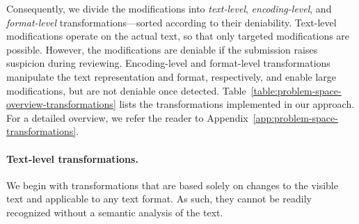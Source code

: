 \documentclass[letterpaper,twocolumn,10pt]{article}
\begin{document}
\begin{table}[t]
\centering
\footnotesize
\caption{\textbf{Problem-space transformations.} Overview of transformations to realize modifications in the problem space. They are grouped by deniability (text, encoding, format) and the capability to add or delete words. For a detailed description, see Appendix~\ref{app:problem-space-transformations}.}
\vspace{-0.1cm}
\label{table:problem-space-overview-transformations}
\vspace{-1.5em}
\end{table} 
Consequently, we divide the modifications into \emph{text-level}, \emph{encoding-level}, and \emph{format-level} transformations---sorted according to their deniability. Text-level modifications operate on the actual text, so that only targeted modifications are possible. However, the modifications are deniable if the submission raises suspicion during reviewing. Encoding-level and format-level transformations manipulate the text representation and format, respectively, and enable large modifications, but are not deniable once detected.
Table~\ref{table:problem-space-overview-transformations} lists the transformations implemented in our approach. For a detailed overview, we refer the reader to Appendix~\ref{app:problem-space-transformations}.

\paragraph{Text-level transformations.}
We begin with transformations that are based solely on changes to the visible text and applicable to any text format. As such, they cannot be readily recognized without a semantic analysis of the text.
\end{document}
